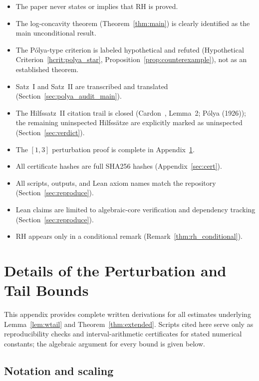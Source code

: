 \documentclass[11pt]{article}
\theoremstyle{definition}
\theoremstyle{remark}
\begin{document}
\begin{itemize}[leftmargin=2em,itemsep=2pt]
\item[$\square$] The paper never states or implies that RH is proved.
\item[$\square$] The log-concavity theorem (Theorem~\ref{thm:main}) is clearly
  identified as the main unconditional result.
\item[$\square$] The P\'{o}lya-type criterion is labeled hypothetical and refuted
  (Hypothetical Criterion~\ref{hcrit:polya_star},
  Proposition~\ref{prop:counterexample}), not as an established theorem.
\item[$\square$] Satz~I and Satz~II are transcribed and translated
  (Section~\ref{sec:polya_audit_main}).
\item[$\square$] The Hilfssatz~II citation trail is closed
  (Cardon~\cite{cardon2005}, Lemma~2; P\'{o}lya (1926)); the remaining
  uninspected Hilfss\"{a}tze are explicitly marked as uninspected
  (Section~\ref{sec:verdict}).
\item[$\square$] The $[1,3]$ perturbation proof is complete in Appendix~\ref{sec:appE}.
\item[$\square$] All certificate hashes are full SHA256 hashes (Appendix~\ref{sec:cert}).
\item[$\square$] All scripts, outputs, and Lean axiom names match the repository
  (Section~\ref{sec:reproduce}).
\item[$\square$] Lean claims are limited to algebraic-core verification and dependency
  tracking (Section~\ref{sec:reproduce}).
\item[$\square$] RH appears only in a conditional remark (Remark~\ref{thm:rh_conditional}).
\end{itemize}

\section{Details of the Perturbation and Tail Bounds}
\label{sec:appE}

This appendix provides complete written derivations for all estimates underlying
Lemma~\ref{lem:wtail} and Theorem~\ref{thm:extended}.
Scripts cited here serve only as reproducibility checks and interval-arithmetic
certificates for stated numerical constants; the algebraic argument for every bound
is given below.

\subsection{Notation and scaling}
\end{document}
